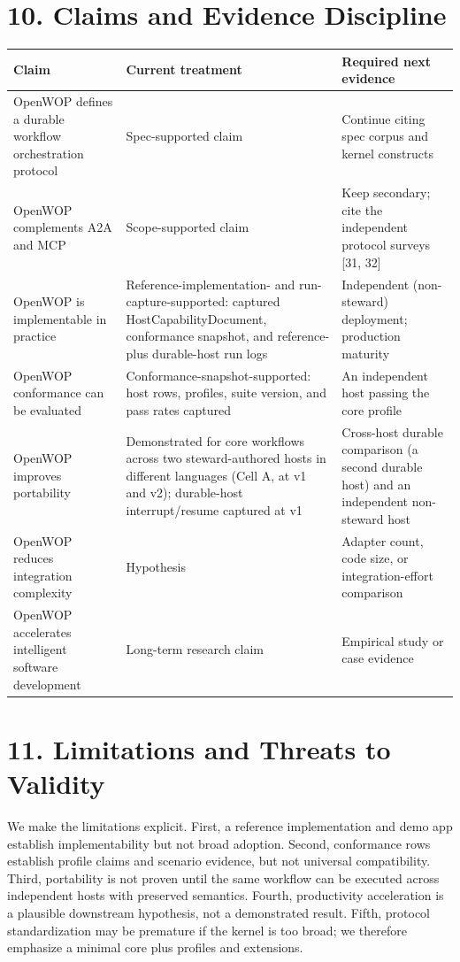 \documentclass[11pt]{article}
\begin{document}
\section*{10. Claims and Evidence Discipline}
\begin{table}[H]\centering\footnotesize
\begin{tabular}{>{\raggedright\arraybackslash}p{}>{\raggedright\arraybackslash}p{}>{\raggedright\arraybackslash}p{}}\hline
\textbf{Claim} & \textbf{Current treatment} & \textbf{Required next evidence} \\\hline
OpenWOP defines a durable workflow orchestration protocol & Spec-supported claim & Continue citing spec corpus and kernel constructs \\\hline
OpenWOP complements A2A and MCP & Scope-supported claim & Keep secondary; cite the independent protocol surveys [31, 32] \\\hline
OpenWOP is implementable in practice & Reference-implementation- and run-capture-supported: captured HostCapabilityDocument, conformance snapshot, and reference- plus durable-host run logs & Independent (non-steward) deployment; production maturity \\\hline
OpenWOP conformance can be evaluated & Conformance-snapshot-supported: host rows, profiles, suite version, and pass rates captured & An independent host passing the core profile \\\hline
OpenWOP improves portability & Demonstrated for core workflows across two steward-authored hosts in different languages (Cell A, at v1 and v2); durable-host interrupt/resume captured at v1 & Cross-host durable comparison (a second durable host) and an independent non-steward host \\\hline
OpenWOP reduces integration complexity & Hypothesis & Adapter count, code size, or integration-effort comparison \\\hline
OpenWOP accelerates intelligent software development & Long-term research claim & Empirical study or case evidence \\\hline
\end{tabular}\end{table}
\section*{11. Limitations and Threats to Validity}
We make the limitations explicit. First, a reference implementation and demo app establish implementability but not broad adoption. Second, conformance rows establish profile claims and scenario evidence, but not universal compatibility. Third, portability is not proven until the same workflow can be executed across independent hosts with preserved semantics. Fourth, productivity acceleration is a plausible downstream hypothesis, not a demonstrated result. Fifth, protocol standardization may be premature if the kernel is too broad; we therefore emphasize a minimal core plus profiles and extensions.
\end{document}
